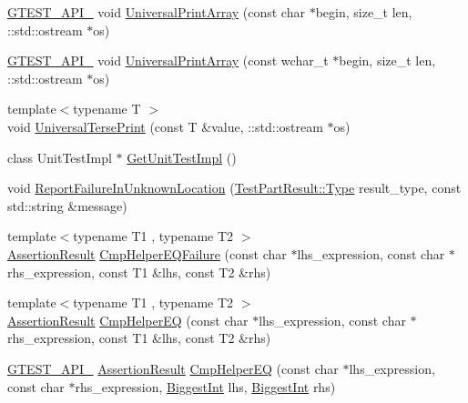 \begin{DoxyCompactItemize}
\mbox{\hyperlink{gtest-port_8h_aa73be6f0ba4a7456180a94904ce17790}{G\+T\+E\+S\+T\+\_\+\+A\+P\+I\+\_\+}} void \mbox{\hyperlink{namespacetesting_1_1internal_a72c997dbd2c562110b2cb56c359decfa}{Universal\+Print\+Array}} (const char $\ast$begin, size\+\_\+t len, \+::std\+::ostream $\ast$os)
\item 
\mbox{\hyperlink{gtest-port_8h_aa73be6f0ba4a7456180a94904ce17790}{G\+T\+E\+S\+T\+\_\+\+A\+P\+I\+\_\+}} void \mbox{\hyperlink{namespacetesting_1_1internal_ae31e146c35fd75afc6a9cc73ae2692d1}{Universal\+Print\+Array}} (const wchar\+\_\+t $\ast$begin, size\+\_\+t len, \+::std\+::ostream $\ast$os)
\item 
{\footnotesize template$<$typename T $>$ }\\void \mbox{\hyperlink{namespacetesting_1_1internal_afa92f5a284929dc3723e654a25feb7b9}{Universal\+Terse\+Print}} (const T \&value, \+::std\+::ostream $\ast$os)
\item 
class Unit\+Test\+Impl $\ast$ \mbox{\hyperlink{namespacetesting_1_1internal_a6211ab15f810f84dd40f111f5b4c9b32}{Get\+Unit\+Test\+Impl}} ()
\item 
void \mbox{\hyperlink{namespacetesting_1_1internal_a85f6ff0e40f9a5f10af66a73cf1364fa}{Report\+Failure\+In\+Unknown\+Location}} (\mbox{\hyperlink{classtesting_1_1_test_part_result_a65ae656b33fdfdfffaf34858778a52d5}{Test\+Part\+Result\+::\+Type}} result\+\_\+type, const std\+::string \&message)
\item 
{\footnotesize template$<$typename T1 , typename T2 $>$ }\\\mbox{\hyperlink{classtesting_1_1_assertion_result}{Assertion\+Result}} \mbox{\hyperlink{namespacetesting_1_1internal_a1def8ec9393360a1b34a20528703e7f7}{Cmp\+Helper\+E\+Q\+Failure}} (const char $\ast$lhs\+\_\+expression, const char $\ast$rhs\+\_\+expression, const T1 \&lhs, const T2 \&rhs)
\item 
{\footnotesize template$<$typename T1 , typename T2 $>$ }\\\mbox{\hyperlink{classtesting_1_1_assertion_result}{Assertion\+Result}} \mbox{\hyperlink{namespacetesting_1_1internal_a4638c74d9b32e971f9b321af6fafc2f1}{Cmp\+Helper\+EQ}} (const char $\ast$lhs\+\_\+expression, const char $\ast$rhs\+\_\+expression, const T1 \&lhs, const T2 \&rhs)
\item 
\mbox{\hyperlink{gtest-port_8h_aa73be6f0ba4a7456180a94904ce17790}{G\+T\+E\+S\+T\+\_\+\+A\+P\+I\+\_\+}} \mbox{\hyperlink{classtesting_1_1_assertion_result}{Assertion\+Result}} \mbox{\hyperlink{namespacetesting_1_1internal_a1edf90480571c0659a39d13e3777d9ce}{Cmp\+Helper\+EQ}} (const char $\ast$lhs\+\_\+expression, const char $\ast$rhs\+\_\+expression, \mbox{\hyperlink{namespacetesting_1_1internal_a05c6bd9ede5ccdf25191a590d610dcc6}{Biggest\+Int}} lhs, \mbox{\hyperlink{namespacetesting_1_1internal_a05c6bd9ede5ccdf25191a590d610dcc6}{Biggest\+Int}} rhs)

\end{DoxyCompactItemize}
